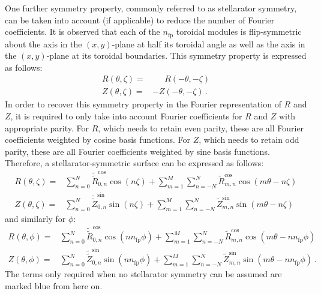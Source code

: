 One further symmetry property, commonly referred to as stellarator symmetry,
can be taken into account (if applicable) to reduce the number of Fourier coefficients.
It is observed that each of the $n_\mathrm{fp}$ toroidal modules is flip-symmetric about the axis in the $(x,y)$-plane at half its toroidal angle
as well as the axis in the $(x,y)$-plane at its toroidal boundaries.
This symmetry property is expressed as follows:
\begin{align}
  R(\theta, \zeta) =& \phantom{-}~ R(-\theta, -\zeta) \\
  Z(\theta, \zeta) =&          -   Z(-\theta, -\zeta) \, .
\end{align}
In order to recover this symmetry property in the Fourier representation of $R$ and $Z$,
it is required to only take into account Fourier coefficients for $R$ and $Z$ with appropriate parity.
For $R$, which needs to retain even parity, these are all Fourier coefficients weighted by cosine basis functions.
For $Z$, which needs to retain  odd parity, these are all Fourier coefficients weighted by sine basis functions.
Therefore, a stellarator-symmetric surface can be expressed as follows:
\begin{align}
    R(\theta, \zeta)
 =&                  \sum_{n= 0}^{N} \tilde{\tilde{R}}_{0,n}^\mathrm{cos}            \cos(n \zeta)
    + \sum_{m=1}^{M} \sum_{n=-N}^{N}         \tilde{R}_{m,n}^\mathrm{cos} \cos(m \theta - n \zeta) \label{eqn:stellsymR} \\
    Z(\theta, \zeta)
 =&                  \sum_{n= 0}^{N} \tilde{\tilde{Z}}_{0,n}^\mathrm{sin}            \sin(n \zeta)
    + \sum_{m=1}^{M} \sum_{n=-N}^{N}         \tilde{Z}_{m,n}^\mathrm{sin} \sin(m \theta - n \zeta) \label{eqn:stellsymZ}
\end{align}
and similarly for $\phi$:
\begin{align}
    R(\theta, \phi)
 =&                  \sum_{n= 0}^{N} \tilde{\tilde{R}}_{0,n}^\mathrm{cos}            \cos(n n_\mathrm{fp} \phi)
    + \sum_{m=1}^{M} \sum_{n=-N}^{N}         \tilde{R}_{m,n}^\mathrm{cos} \cos(m \theta - n n_\mathrm{fp} \phi) \label{eqn:stellsymRPhi} \\
    Z(\theta, \phi)
 =&                  \sum_{n= 0}^{N} \tilde{\tilde{Z}}_{0,n}^\mathrm{sin}            \sin(n n_\mathrm{fp} \phi)
    + \sum_{m=1}^{M} \sum_{n=-N}^{N}         \tilde{Z}_{m,n}^\mathrm{sin} \sin(m \theta - n n_\mathrm{fp} \phi) \label{eqn:stellsymZPhi} \, .
\end{align}
The terms only required when no stellarator symmetry can be assumed are marked {\color{blue}blue} from here on.

